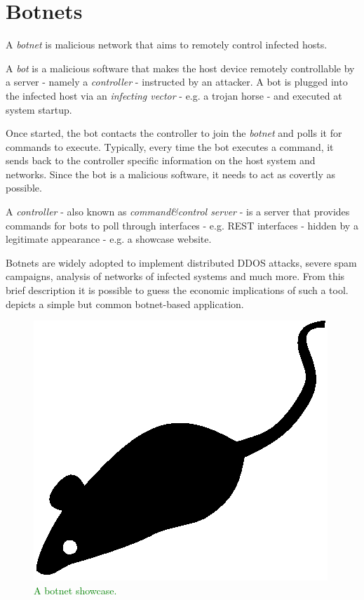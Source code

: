 \section{Botnets}
\label{sec:botnets}

A \textit{botnet} is malicious network that aims to remotely control infected hosts.

A \textit{bot} is a malicious software that makes the host device remotely controllable by a server - namely a \textit{controller} -  instructed by an attacker. A bot is plugged into the infected host via an \textit{infecting vector} - e.g. a trojan horse - and executed at system startup.

Once started, the bot contacts the controller to join the \textit{botnet} and polls it for commands to execute. Typically, every time the bot executes a command, it sends back to the controller specific information on the host system and networks. Since the bot is a malicious software, it needs to act as covertly as possible.

\textcolor{blue}{\lipsum[1]}

A \textit{controller} - also known as \textit{command\&control server} - is a server that provides commands for bots to poll through interfaces - e.g. REST interfaces - hidden by a legitimate appearance - e.g. a showcase website.

Botnets are widely adopted to implement distributed DDOS attacks, severe spam campaigns, analysis of networks of infected systems and much more. From this brief description it is possible to guess the economic implications of such a tool.  depicts a simple but common botnet-based application.

\begin{figure}[tp]
  \centering
  \includegraphics{./fig/acmlarge-mouse}
  \caption{\textcolor{green}{A botnet showcase.}}
    \label{fig:botnet-showcase}
\end{figure}

